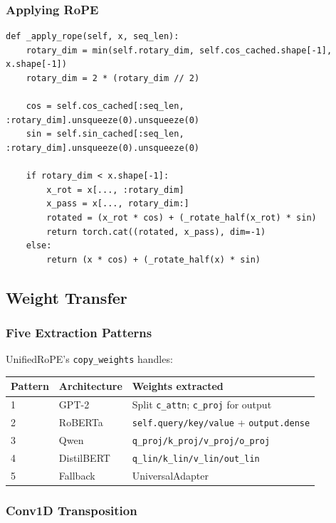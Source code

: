 \subsubsection{Applying RoPE}

\begin{lstlisting}
def _apply_rope(self, x, seq_len):
    rotary_dim = min(self.rotary_dim, self.cos_cached.shape[-1], x.shape[-1])
    rotary_dim = 2 * (rotary_dim // 2)
    
    cos = self.cos_cached[:seq_len, :rotary_dim].unsqueeze(0).unsqueeze(0)
    sin = self.sin_cached[:seq_len, :rotary_dim].unsqueeze(0).unsqueeze(0)
    
    if rotary_dim < x.shape[-1]:
        x_rot = x[..., :rotary_dim]
        x_pass = x[..., rotary_dim:]
        rotated = (x_rot * cos) + (_rotate_half(x_rot) * sin)
        return torch.cat((rotated, x_pass), dim=-1)
    else:
        return (x * cos) + (_rotate_half(x) * sin)
\end{lstlisting}

\subsection{Weight Transfer}

\subsubsection{Five Extraction Patterns}

UnifiedRoPE's \texttt{copy\_weights} handles:

\begin{table}[H]
\centering
\small
\begin{tabular}{lll}
\toprule
\textbf{Pattern} & \textbf{Architecture} & \textbf{Weights extracted} \\
\midrule
1 & GPT-2 & Split \texttt{c\_attn}; \texttt{c\_proj} for output \\
2 & RoBERTa & \texttt{self.query/key/value} + \texttt{output.dense} \\
3 & Qwen & \texttt{q\_proj/k\_proj/v\_proj/o\_proj} \\
4 & DistilBERT & \texttt{q\_lin/k\_lin/v\_lin/out\_lin} \\
5 & Fallback & UniversalAdapter \\
\bottomrule
\end{tabular}
\end{table}

\subsubsection{Conv1D Transposition}


